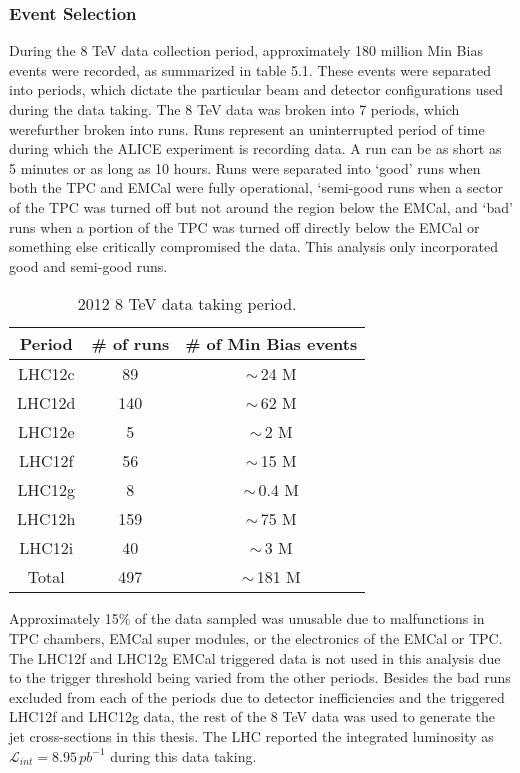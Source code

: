 \noindent



\subsubsection{Event Selection}

During the 8 TeV data collection period, approximately 180 million Min Bias events were recorded, as summarized in table 5.1.  These events were separated into periods, which dictate the particular beam and detector configurations used during the data taking.  The 8 TeV data was broken into 7 periods, which werefurther broken into runs.  Runs represent an uninterrupted period of time during which the ALICE experiment is recording data. A run can be as short as 5 minutes or as long as 10 hours.  Runs were separated into `good' runs when both the TPC and EMCal were fully operational, `semi-good runs when a sector of the TPC was turned off but not around the region below the EMCal, and `bad' runs when a portion of the TPC was turned off directly below the EMCal or something else critically compromised the data.  This analysis only incorporated good and semi-good runs.

\begin{table}[hb]
\label{tab:RunSummary}
\begin{center}
\begin{tabular}[b]{|c|c|c|}
	\hline
	Period & \# of runs & \# of Min Bias events \\ \hline
	LHC12c & 89 & $\sim \,$24 M \\ \hline
	LHC12d & 140 & $\sim \,$62 M \\ \hline
	LHC12e & 5 & $\sim \,$2 M \\ \hline
	LHC12f & 56 & $\sim \,$15 M \\ \hline
	LHC12g & 8 & $\sim \,$0.4 M \\ \hline
	LHC12h & 159 & $\sim \,$75 M \\ \hline
	LHC12i & 40 & $\sim \,$3 M \\ \hline
	Total & 497 & $\sim \,$181 M \\ \hline

\end{tabular}
\end{center}
\caption{2012 8 TeV data taking period.}
\end{table}

Approximately 15\% of the data sampled was unusable due to malfunctions in TPC chambers, EMCal super modules, or the electronics of the EMCal or TPC.  The LHC12f  and LHC12g EMCal triggered data is not used in this analysis due to the trigger threshold being varied from the other periods.  Besides the bad runs excluded from each of the periods due to detector inefficiencies and the triggered LHC12f and LHC12g data, the rest of the 8 TeV data was used to generate the jet cross-sections in this thesis.  The LHC reported the integrated luminosity as $\mathscr{L}_{int} = 8.95 \, pb^{-1}$ during this data taking\cite{ALICE-PUBLIC-2017-002}.

